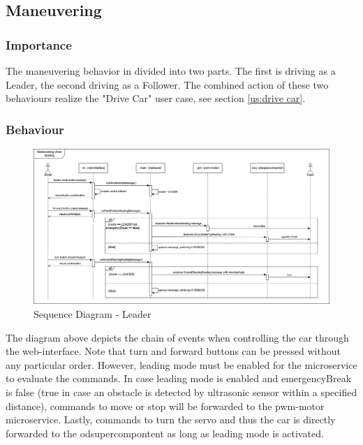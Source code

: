 \documentclass[12pt]{article}
\begin{document}
\subsection{Maneuvering}

\subsubsection{Importance}
The maneuvering behavior in divided into two parts. The first is driving as a Leader, the second driving as a Follower. The combined action of these two behaviours realize the "Drive Car" user case, see section \ref{us:drive car}. 

\subsubsection{Behaviour}


\FloatBarrier %
\begin{figure}[ht!]
\centering
\includegraphics[width=\linewidth]{Diagrams/SequenceDiagramsManeuveringLeader.png}
\caption{Sequence Diagram - Leader}
\label{fig:SD_maneuvering_leader}
\end{figure}

The diagram above depicts the chain of events when controlling the car through the web-interface. Note that turn and forward buttons can be pressed without any particular order. However, leading mode must be enabled for the microservice to evaluate the commands. In case leading mode is enabled and emergencyBreak is false (true in case an obstacle is detected by ultrasonic sensor within a specified distance), commands to move or stop will be forwarded to the pwm-motor microservice. Lastly, commands to turn the servo and thus the car is directly forwarded to the odsupercompontent as long as leading mode is activated. 
\end{document}

